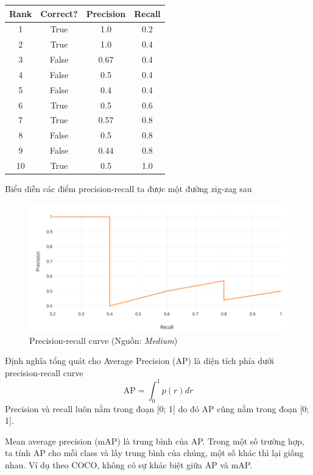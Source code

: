 \documentclass[a4paper, 12pt]{report}
\begin{document}
	\begin{center}
		\begin{tabular}{||c c c c ||} 
			\hline
			Rank & Correct? & Precision & Recall \\ [0.5ex] 
			\hline\hline
			1 & True & 1.0 & 0.2   \\ 
			\hline
			2 & True & 1.0 & 0.4   \\
			\hline
			3 & False & 0.67 & 0.4 \\
			\hline
			4 & False & 0.5 & 0.4  \\
			\hline
			5 & False & 0.4 & 0.4  \\ 
			\hline
			6 & True & 0.5 & 0.6  \\
			\hline
			7 & True & 0.57 & 0.8  \\
			\hline
			8 & False & 0.5 & 0.8  \\
			\hline
			9 & False & 0.44 & 0.8  \\
			\hline
			10 & True & 0.5 & 1.0 \\
			\hline
		\end{tabular}
	\end{center}
Biểu diễn các điểm precision-recall ta được một đường zig-zag sau\par 
\begin{figure}[!h]
	\centering
	\includegraphics[width=0.7\linewidth]{Images/screensprhot001}
	\caption{Precision-recall curve (Nguồn: \textit{Medium})}
	\label{fig:screensprhot001}
\end{figure}
Định nghĩa tổng quát cho Average Precision (AP) là diện tích phía dưới precision-recall curve 
$$ \text{AP} = \int_{0}^{1}p(r)dr$$
Precision và recall luôn nằm trong đoạn [0; 1] do đó AP cũng nằm trong đoạn [0; 1].  \par
Mean average precision (mAP) là trung bình của AP. Trong một số trường hợp, ta tính AP cho mỗi class và lấy trung bình của chúng, một số khác thì lại giống nhau. Ví dụ theo COCO, không có sự khác biệt giữa AP và mAP.\par
\end{document}
